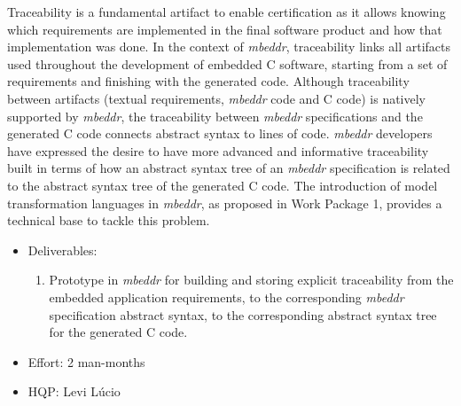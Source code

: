 Traceability is a fundamental artifact to enable certification as it allows
knowing which requirements are implemented in the final software product and how
that implementation was done. In the context of \emph{mbeddr}, traceability links all
artifacts used throughout the development of embedded C software, starting from
a set of requirements and finishing with the generated code. Although
traceability between artifacts (textual requirements, \emph{mbeddr} code and C code) is
natively supported by \emph{mbeddr}, the traceability between \emph{mbeddr} specifications and
the generated C code connects abstract syntax to lines of code. \emph{mbeddr}
developers have expressed the desire to have more advanced and informative
traceability built in terms of how an abstract syntax tree of an \emph{mbeddr}
specification is related to the abstract syntax tree of the generated C code.
The introduction of model transformation languages in \emph{mbeddr}, as proposed in
Work Package 1, provides a technical base to tackle this problem.


\begin{itemize}
  \item Deliverables:
  \begin{enumerate}
    \item Prototype in \emph{mbeddr} for building and storing explicit traceability
    from the embedded application requirements, to the corresponding \emph{mbeddr}
    specification abstract syntax, to the corresponding abstract syntax tree for
    the generated C code.
  \end{enumerate}
  \item Effort: 2 man-months
  \item HQP: Levi L\'ucio
\end{itemize}
